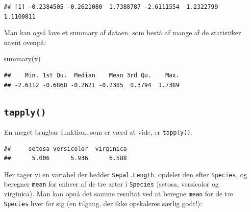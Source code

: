 \documentclass[
]{book}
\newenvironment{Shaded}{\begin{snugshade}}{\end{snugshade}}
\newcommand{\CommentTok}[1]{\textcolor[rgb]{0.56,0.35,0.01}{\textit{#1}}}
\newcommand{\FunctionTok}[1]{\textcolor[rgb]{0.00,0.00,0.00}{#1}}
\newcommand{\NormalTok}[1]{#1}
\newcommand{\SpecialCharTok}[1]{\textcolor[rgb]{0.00,0.00,0.00}{#1}}
\begin{document}
\begin{verbatim}
## [1] -0.2384505 -0.2621080  1.7388787 -2.6111554  1.2322799  1.1100811
\end{verbatim}

Man kan også lave et summary af dataen, som bestå af mange af de statistiker navnt ovenpå:

\begin{Shaded}
\begin{Highlighting}[]
\FunctionTok{summary}\NormalTok{(x)}
\end{Highlighting}
\end{Shaded}

\begin{verbatim}
##    Min. 1st Qu.  Median    Mean 3rd Qu.    Max. 
## -2.6112 -0.6868 -0.2621 -0.2385  0.3794  1.7389
\end{verbatim}

\hypertarget{tapply}{%
\subsection{\texorpdfstring{\texttt{tapply()}}{tapply()}}\label{tapply}}

En meget brugbar funktion, som er værd at vide, er \texttt{tapply()}.

\begin{Shaded}
\end{Shaded}

\begin{verbatim}
##     setosa versicolor  virginica 
##      5.006      5.936      6.588
\end{verbatim}

Her tager vi en variabel der hedder \texttt{Sepal.Length}, opdeler den efter \texttt{Species}, og beregner \texttt{mean} for enhver af de tre arter i \texttt{Species} (setosa, versicolor og virginica). Man kan opnå det samme resultat ved at beregne \texttt{mean} for de tre \texttt{Species} hver for sig (en tilgang, der ikke opskaleres særlig godt!):
\end{document}
